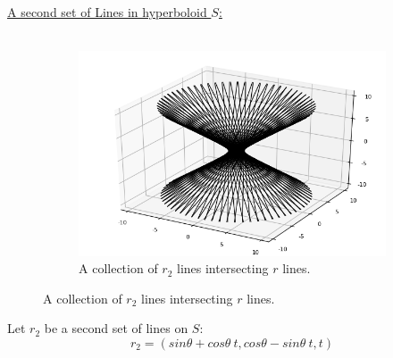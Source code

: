 \documentclass[12pt]{article}
\begin{document}
\noindent
\underline{A second set of Lines in hyperboloid $S$:}\\\\
\indent
\begin{figure}[h!]
  \centering
      \begin{subfigure}[b]{0.6\linewidth}
    \includegraphics[width=\linewidth]{./assets/4-1-3/hyperboloid-line-rotation-skew.png}
    \caption*{A collection of $r_2$ lines intersecting $r$ lines.}
  \end{subfigure}
  \end{figure}

Let $r_2$ be a second set of lines on $S$:
$$
r_2 = ( sin\theta + cos\theta \ t, cos\theta - sin\theta \ t, t)
$$
\end{document}
